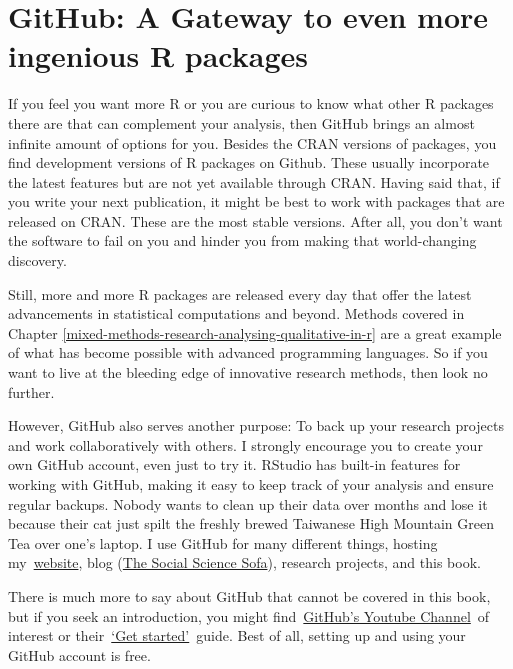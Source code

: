 \documentclass[
]{book}
\begin{document}
\hypertarget{github-a-gateway-to-even-more-ingenious-r-packages}{%
\section{GitHub: A Gateway to even more ingenious R packages}\label{github-a-gateway-to-even-more-ingenious-r-packages}}

If you feel you want more R or you are curious to know what other R packages there are that can complement your analysis, then GitHub brings an almost infinite amount of options for you. Besides the CRAN versions of packages, you find development versions of R packages on Github. These usually incorporate the latest features but are not yet available through CRAN. Having said that, if you write your next publication, it might be best to work with packages that are released on CRAN. These are the most stable versions. After all, you don't want the software to fail on you and hinder you from making that world-changing discovery.

Still, more and more R packages are released every day that offer the latest advancements in statistical computations and beyond. Methods covered in Chapter \ref{mixed-methods-research-analysing-qualitative-in-r} are a great example of what has become possible with advanced programming languages. So if you want to live at the bleeding edge of innovative research methods, then look no further.

However, GitHub also serves another purpose: To back up your research projects and work collaboratively with others. I strongly encourage you to create your own GitHub account, even just to try it. RStudio has built-in features for working with GitHub, making it easy to keep track of your analysis and ensure regular backups. Nobody wants to clean up their data over months and lose it because their cat just spilt the freshly brewed Taiwanese High Mountain Green Tea over one's laptop. I use GitHub for many different things, hosting my~\href{http://danieldauber.com}{website}, blog (\href{http://thesocialsciencesofa.com}{The Social Science Sofa}), research projects, and this book.

There is much more to say about GitHub that cannot be covered in this book, but if you seek an introduction, you might find~\href{https://www.youtube.com/user/github}{GitHub's Youtube Channel}~of interest or their~\href{https://docs.github.com/en}{`Get started'}~guide. Best of all, setting up and using your GitHub account is free.
\end{document}
